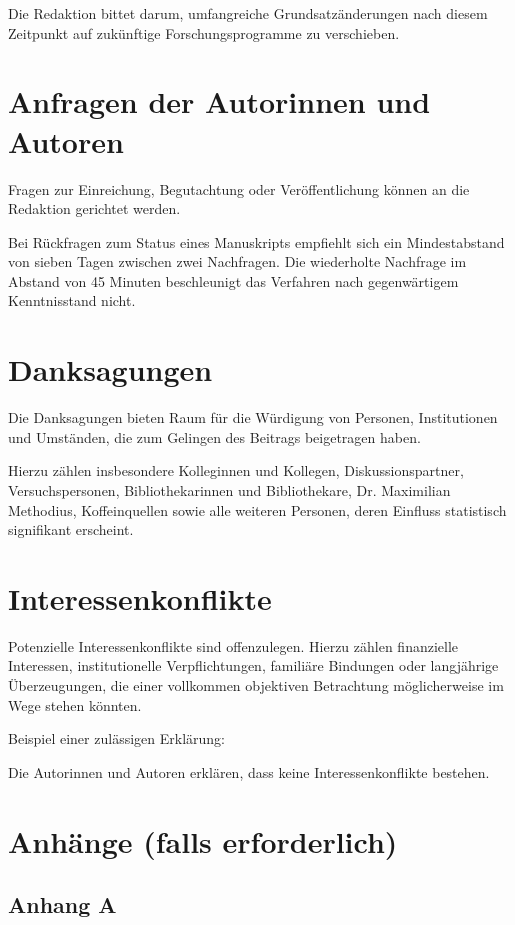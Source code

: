 \documentclass[research]{zal}
\begin{document}
Die Redaktion bittet darum, umfangreiche Grundsatzänderungen nach diesem Zeitpunkt auf zukünftige Forschungsprogramme zu verschieben.

\section{Anfragen der Autorinnen und Autoren}

Fragen zur Einreichung, Begutachtung oder Veröffentlichung können an die Redaktion gerichtet werden.

Bei Rückfragen zum Status eines Manuskripts empfiehlt sich ein Mindestabstand von sieben Tagen zwischen zwei Nachfragen. Die wiederholte Nachfrage im Abstand von 45 Minuten beschleunigt das Verfahren nach gegenwärtigem Kenntnisstand nicht.

\section*{Danksagungen}

Die Danksagungen bieten Raum für die Würdigung von Personen, Institutionen und Umständen, die zum Gelingen des Beitrags beigetragen haben.

Hierzu zählen insbesondere Kolleginnen und Kollegen, Diskussionspartner, Versuchspersonen, Bibliothekarinnen und Bibliothekare, Dr. Maximilian Methodius, Koffeinquellen sowie alle weiteren Personen, deren Einfluss statistisch signifikant erscheint.

\section*{Interessenkonflikte}

Potenzielle Interessenkonflikte sind offenzulegen. Hierzu zählen finanzielle Interessen, institutionelle Verpflichtungen, familiäre Bindungen oder langjährige Überzeugungen, die einer vollkommen objektiven Betrachtung möglicherweise im Wege stehen könnten.

Beispiel einer zulässigen Erklärung:

Die Autorinnen und Autoren erklären, dass keine Interessenkonflikte bestehen.

\section*{Anhänge (falls erforderlich)}

\subsection*{Anhang A}
\end{document}

